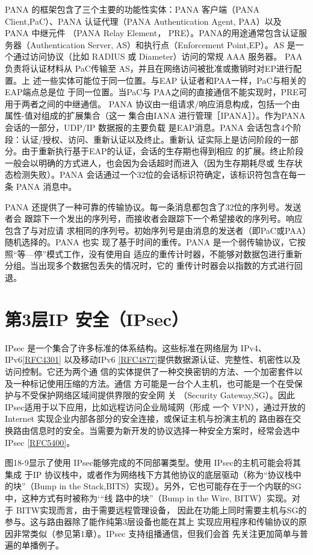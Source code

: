 PANA 的框架包含了三个主要的功能性实体：PANA 客户端（PANA Client,PaC）、PANA
认证代理（PANA Authentication Agent, PAA）以及 PANA 中继元件 （PANA Relay Element，
PRE）。PANA的用途通常包含认证服务器（Authentication Server, AS）和执行点（Enforcement
Point,EP）。AS 是一个通过访问协议（比如 RADIUS 或 Diameter）访问的常规 AAA 服务器。
PAA负责将认证材料从 PaC传输至 AS，并且在网络访问被批准或撒销时对EP进行配置。上
述一些实体可能位于同一位置。与EAP 认证者和PAA一样，PaC与相关的EAP端点总是位
于同一位置。当PaC与 PAA之间的直接通信不能实现时，PRE可用于两者之间的中继通信。
PANA 协议由一组请求/响应消息构成，包括一个由属性-值对组成的扩展集合（这一
集合由IANA 进行管理［IPANA］）。作为PANA会话的一部分，UDP/IP 数据报的主要负载
是EAP消息。PANA 会话包含4个阶段：认证/授权、访问、重新认证以及终止。重新认
证实际上是访问阶段的一部分。由于重新执行基于EAP的认证，会话的生存期也得到相应
的扩展。终止阶段一般会以明确的方式进人，也会因为会话超时而进入（因为生存期耗尽或
生存状态检测失败）。PANA 会话通过一个32位的会话标识符确定，该标识符包含在每一条
PANA 消息中。

PANA 还提供了一种可靠的传输协议。每一条消息都包含了32位的序列号。发送者会
跟踪下一个发出的序列号，而接收者会跟踪下一个希望接收的序列号。响应包含了与对应请
求相同的序列号。初始序列号是由消息的发送者（即PaC或PAA）随机选择的。PANA 也实
现了基于时间的重传。PANA 是一个弱传输协议，它按照“等—停”模式工作，没有使用自
适应的重传计时器，不能够对数据包进行重新分组。当出现多个数据包丢失的情况时，它的
重传计时器会以指数的方式进行回退。

\section{第3层IP 安全（IPsec）}

IPsec 是一个集合了许多标准的体系结构。这些标准在网络层为 IPv4、IPv6\href{https://www.rfc-editor.org/rfc/rfc4301}{[RFC4301]}
以及移动IPv6 \href{https://www.rfc-editor.org/rfc/rfc4877}{[RFC4877]}提供数据源认证、完整性、机密性以及访问控制。它还为两个通
信的实体提供了一种交换密钥的方法、一个加密套件以及一种标记使用压缩的方法。通信
方可能是一台个人主机，也可能是一个在受保护与不受保护网络区域间提供界限的安全网
关 （Security Gateway,SG）。因此IPsec适用于以下应用，比如远程访问企业局域网（形成
一个 VPN），通过开放的Internet 实现企业内部各部分的安全连接，或保证主机与扮演主机的
路由器在交换路由信息时的安全。当需要为新开发的协议选择一种安全方案时，经常会选中
IPsec \href{https://www.rfc-editor.org/rfc/rfc5400}{[RFC5400]}。

图18-9显示了使用 IPsec能够完成的不同部署类型。使用 IPsec的主机可能会将其集成
于IP 协议栈中，或者作为网络栈下方其他协议的底层驱动（称为“协议栈中的块”（Bump in
the Stack,BITS）实现）。另外，它也可能存在于一个内联的SG 中，这种方式有时被称为‘“线
路中的块”（Bump in the Wire, BITW）实现。对于 BITW实现而言，由于需要远程管理设备，
因此在功能上同时需要主机与SG的参与。这与路由器除了能作纯第3层设备也能在其上
实现应用程序和传输协议的原因非常类似（参见第1章）。IPsec 支持组播通信，但我们会首
先关注更加简单与普遍的单播例子。

